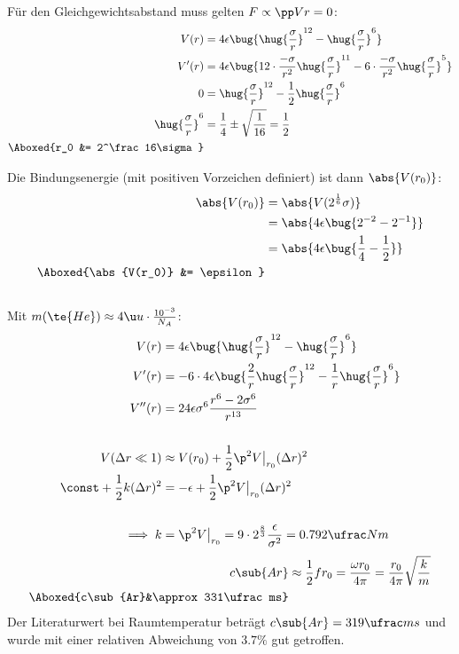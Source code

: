 \documentclass[exa]{exercise_5.0}
\begin{document}
\subsection{}
Für den Gleichgewichtsabstand muss gelten $F \propto \pp Vr =0$:
\begin{align*}
    V(r) &= 4\epsilon \bug{\hug{\frac \sigma r}^{12} - \hug{\frac \sigma r}^6}\\
    V'(r) &= 4\epsilon \bug{12\cdot \frac{-\sigma}{r^2}\hug{\frac \sigma r}^{11} - 6\cdot \frac{-\sigma }{r^2}\hug{\frac \sigma r}^5}\\
    0 &=  \hug{\frac \sigma r}^{12} - \frac12\hug{\frac \sigma r}^6\\
    \hug{\frac \sigma r}^6 &= \frac14 \pm \sqrt{\frac1{16}}= \frac 12\\
    \Aboxed{r_0 &= 2^\frac16\sigma}
\end{align*}

Die Bindungsenergie (mit positiven Vorzeichen definiert) ist dann $\abs{V(r_0)}$:
\begin{align*}
    \abs{V(r_0)} &= \abs{V(2^{\frac16} \sigma )}\\
    &= \abs{4\epsilon \bug{2^{-2} - 2^{-1}}}\\
    &= \abs{4\epsilon \bug{\frac14 -\frac12}}\\
    \Aboxed{\abs{V(r_0)} &= \epsilon}
\end{align*}

\subsection{}
Mit $m(\te{He})\approx4\u u \cdot \frac{10^{-3}}{N_A}$:
\begin{align*}
    V(r) &= 4\epsilon \bug{\hug{\frac \sigma r}^{12} - \hug{\frac \sigma r}^6}\\
    V'(r) &= -6\cdot 4\epsilon \bug{\frac 2{r}\hug{\frac \sigma r}^{12} - \frac1r\hug{\frac \sigma r}^6}\\
    V''(r) &= 24 \epsilon \sigma^6 \frac{r^6 - 2 \sigma^6}{r^{13}}\\
    \\
    V(\Delta r\ll 1) &\approx V(r_0) + \frac12\p^2 V \big |_{r_0} (\Delta r)^2\\
    \const  + \frac12 k(\Delta r)^2 &= -\epsilon + \frac12\p^2 V \big |_{r_0} (\Delta r)^2\\
    \\
    \implies k &= \p^2V\big|_{r_0} = 9\cdot 2^\frac83 \frac\epsilon{\sigma^2}= 0.792 \ufrac N{m}
\end{align*}
\begin{align*}
    c\sub{Ar} &\approx \frac12 f r_0
    = \frac{\omega r_0}{4\pi} 
    = \frac{r_0}{4\pi}\sqrt{\frac km}\\
    \Aboxed{c\sub{Ar}&\approx 331\ufrac ms}
\end{align*}
Der Literaturwert bei Raumtemperatur beträgt $c\sub{Ar} =  319 \ufrac ms $ und wurde mit einer relativen Abweichung von $3.7\%$ gut getroffen. 
\end{document}
